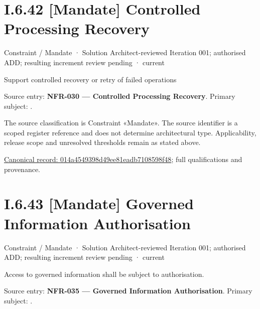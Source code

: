 \section*{I.6.42 [Mandate] Controlled Processing Recovery}
\label{navigation:I.6.42}

\label{element:014a4549398d49ee81eadb7108598f48}
{\small Constraint / Mandate · Solution Architect-reviewed Iteration 001; authorised ADD; resulting increment review pending · current}\par

Support controlled recovery or retry of failed operations



Source entry: \textbf{NFR-030 — Controlled Processing Recovery}. Primary subject: \texttt{}.



The source classification is Constraint «Mandate». The source identifier is a scoped register reference and does not determine architectural type. Applicability, release scope and unresolved thresholds remain as stated above.


{\footnotesize \href{../../../../continuum/motivation/constraint/mandate/014a4549398d49ee81eadb7108598f48.md}{Canonical record: 014a4549398d49ee81eadb7108598f48}; full qualifications and provenance.}\par
\section*{I.6.43 [Mandate] Governed Information Authorisation}
\label{navigation:I.6.43}

\label{element:8812fcd52d3f4afcbeef41b60bda5874}
{\small Constraint / Mandate · Solution Architect-reviewed Iteration 001; authorised ADD; resulting increment review pending · current}\par

Access to governed information shall be subject to authorisation.



Source entry: \textbf{NFR-035 — Governed Information Authorisation}. Primary subject: \texttt{}.




